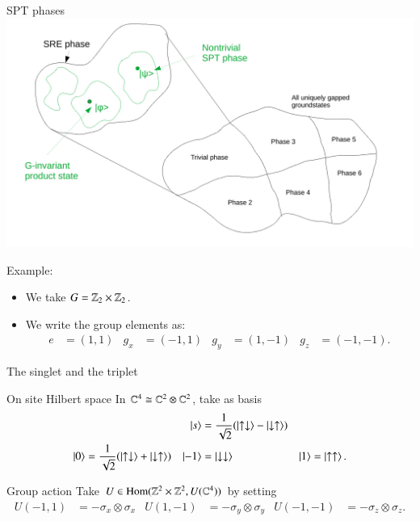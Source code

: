 \documentclass{beamer}
\begin{document}
\begin{frame}{SPT phases}
	\includegraphics[width=\textwidth]{Figures/SPT_Phases.pdf}
\end{frame}

\begin{frame}{Example:}
	\begin{itemize}
		\item We take $G=\mathbb{Z}_2\times\mathbb{Z}_2$.
		\item We write the group elements as:
		\begin{align*}
			e&=(1,1)&g_x&=(-1,1)&g_y&=(1,-1)&g_z&=(-1,-1).
		\end{align*}
	\end{itemize}
	
\end{frame}

\begin{frame}{The singlet and the triplet}
	\begin{block}{On site Hilbert space}
		In $\mathbb{C}^4\cong \mathbb{C}^2\otimes \mathbb{C}^2$, take as basis
		\begin{align*}
			&&\ket{s}&=\frac{1}{\sqrt{2}}(\ket{\uparrow\downarrow}-\ket{\downarrow\uparrow})&&\\
			\ket{0}&=\frac{1}{\sqrt{2}}(\ket{\uparrow\downarrow}+\ket{\downarrow\uparrow})&\ket{-1}&=\ket{\downarrow\downarrow}&\ket{1}&=\ket{\uparrow\uparrow}.
		\end{align*}
	\end{block}
	\pause
	\begin{block}{Group action}
		Take $U\in \textrm{Hom}(\mathbb{Z}^2\times \mathbb{Z}^2,U(\mathbb{C}^4))$ by setting
		\begin{align*}
		U(-1,1)&=-\sigma_x\otimes \sigma_x&U(1,-1)&=-\sigma_y\otimes \sigma_y&U(-1,-1)&=-\sigma_z\otimes \sigma_z.
		\end{align*}
	\end{block}
\end{frame}
\end{document}
